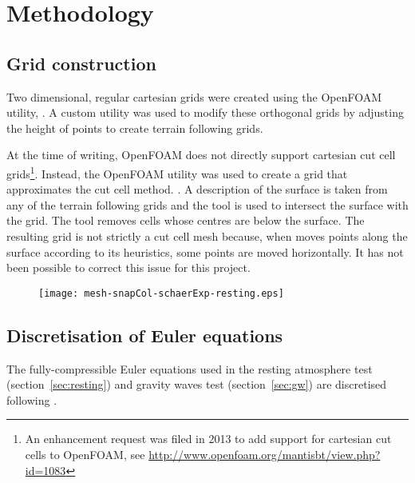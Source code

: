 \chapter{Methodology}

\section{Grid construction}
Two dimensional, regular cartesian grids were created using the OpenFOAM utility, .  A custom utility was used to modify these orthogonal grids by adjusting the height of points to create terrain following grids.

At the time of writing, OpenFOAM does not directly support cartesian cut cell grids\footnote{An enhancement request was filed in 2013 to add support for cartesian cut cells to OpenFOAM, see \url{http://www.openfoam.org/mantisbt/view.php?id=1083}}.  Instead, the  OpenFOAM utility was used to create a grid that approximates the cut cell method.  .  A description of the surface is taken from any of the terrain following grids and the tool is used to intersect the surface with the grid.  The tool removes cells whose centres are below the surface.  The resulting grid is not strictly a cut cell mesh because, when  moves points along the surface according to its heuristics, some points are moved horizontally.  It has not been possible to correct this issue for this project.

\begin{figure}
	\centerfloat
	\texttt{[image: mesh-snapCol-schaerExp-resting.eps]}
	\caption{}
	\label{fig:method:cut-cell}
\end{figure}

\section{Discretisation of Euler equations}
\label{sec:method:discretisation}
The fully-compressible Euler equations used in the resting atmosphere test (section~\ref{sec:resting}) and gravity waves test (section~\ref{sec:gw}) are discretised following \textcite{weller-shahrokhi2014}.  
